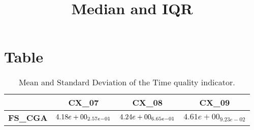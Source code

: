 \documentclass{article}
\title{Median and IQR}
\author{}
\begin{document}
\maketitle
\section{Table}
\begin{table}[!htp]
  \caption{Mean and Standard Deviation of the Time quality indicator.}
  \label{table:Time}
  \centering
  \begin{scriptsize}
  \begin{tabular}{c|ccc}
      & \textbf{CX\_07} & \textbf{CX\_08} & \textbf{CX\_09} \\\hline
      \textbf{FS_CGA} & $\cellcolor{gray25} 4.18e+00_{2.57e-01} $ & $ \cellcolor{gray95} 4.24e+00_{6.65e-01} $ & $ 4.61e+00_{9.23e-02}$ \\
  \end{tabular}
  \end{scriptsize}
\end{table}
\end{document}
